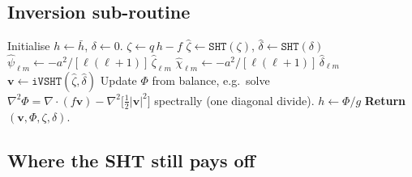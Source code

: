 \documentclass[11pt]{article}
\newcommand{\bvec}[1]{\boldsymbol{#1}}
\begin{document}
\subsection{Inversion sub-routine}

\begin{algorithm}[H]
\caption{\texttt{pv\_invert}: $(q,\bar h)\mapsto (\bvec{v},\Phi,\zeta,\delta)$.}
\begin{algorithmic}[1]
\State Initialise $h \gets \bar h$, $\delta \gets 0$.
\Repeat
    \State $\zeta \gets q\,h - f$
    \State $\hat\zeta \gets \texttt{SHT}(\zeta)$,
           $\hat\delta \gets \texttt{SHT}(\delta)$
    \State $\hat\psi_{\ell m} \gets -a^{2}/[\ell(\ell+1)]\,\hat\zeta_{\ell m}$
    \State $\hat\chi_{\ell m} \gets -a^{2}/[\ell(\ell+1)]\,\hat\delta_{\ell m}$
    \State $\bvec{v} \gets \texttt{iVSHT}(\hat\zeta,\hat\delta)$
    \State Update $\Phi$ from balance, e.g.\ solve
           $\nabla^{2}\Phi = \nabla\!\cdot\!(f\bvec{v})
           - \nabla^{2}\!\bigl[\tfrac{1}{2}|\bvec{v}|^{2}\bigr]$
           spectrally (one diagonal divide).
    \State $h \gets \Phi/g$
\State \textbf{Return} $(\bvec{v},\Phi,\zeta,\delta)$.
\end{algorithmic}
\end{algorithm}

\subsection{Where the SHT still pays off}
\end{document}
